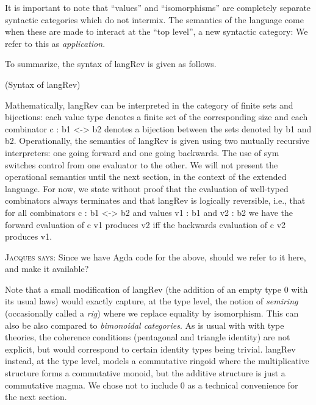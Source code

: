 \documentclass{llncs}
\newcommand{\jacques}[1]{\textsc{Jacques says:} #1}
\begin{document}
It is important to note that ``values'' and ``isomorphisms'' are 
completely separate syntactic categories which do not intermix.  The 
semantics of the language come when these are made to interact at
the ``top level'', a new syntactic category:
We refer to this as \emph{application}.

\noindent
To summarize, the syntax of {{langRev}} is given as follows. 

\begin{definition}{(Syntax of {{langRev}})}
\label{def:Pi}
%
\end{definition}

Mathematically, {{langRev}} can be interpreted in the category of finite sets
and bijections: each value type denotes a finite set of the corresponding size
and each combinator {{c : b1 <-> b2}} denotes a bijection between the sets
denoted by {{b1}} and {{b2}}. Operationally, the semantics of {{langRev}} is
given using two mutually recursive interpreters: one going forward and one
going backwards. The use of {{sym}} switches control from one evaluator to
the other. We will not present the operational semantics until the next
section, in the context of the extended language. For now, we state without
proof that the evaluation of well-typed combinators always terminates and
that {{langRev}} is logically reversible, i.e., that for all combinators 
{{c : b1 <-> b2}} and values {{v1 : b1}} and {{v2 : b2}} we have the forward
evaluation of {{c v1}} produces {{v2}} iff the backwards evaluation of 
{{c v2}} produces {{v1}}.

\jacques{Since we have Agda code for the above, should we refer to it
here, and make it available?}

Note that a small modification of {{langRev}} (the addition of an
empty type {{0}} with its usual laws) would exactly capture, at the type
level, the notion of \emph{semiring} (occasionally called a \emph{rig}) where
we replace equality by isomorphism.  This can also be also compared to
\emph{bimonoidal categories}.  As is usual with with type theories, the
coherence conditions (pentagonal and triangle identity) are not explicit,
but would correspond to certain identity types being trivial.  {{langRev}}
instead, at the type level, models a commutative ringoid where the
multiplicative structure forms a commutative monoid, but the additive structure
is just a commutative magma.  We chose not to include {{0}} as a technical
convenience for the next section.
\end{document}
